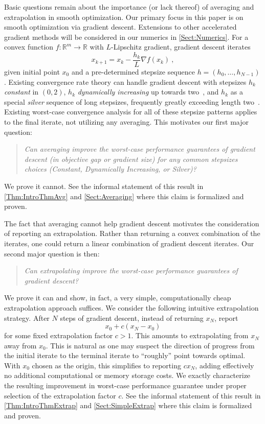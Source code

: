 \documentclass[11pt]{article}
\numberwithin{equation}{section}
\newcommand{\R}{\mathbb{R}}
\theoremstyle{definition}
\theoremstyle{definition}
\theoremstyle{definition}
\newcommand{\1}{\mathbf{1}}
\newcommand{\dimension}{m}
\begin{document}
Basic questions remain about the importance (or lack thereof) of averaging and extrapolation in smooth optimization. Our primary focus in this paper is on smooth optimization via gradient descent. Extensions to other accelerated gradient methods will be considered in our numerics in \cref{Sect:Numerics}. For a convex function $f :\R^\dimension \to \R$ with $L$-Lipschitz gradient, gradient descent iterates
\begin{equation}\label{Eqn:GDStep}
    x_{k+1} = x_k - \frac{h_k}{L}\nabla f(x_k) \ ,
\end{equation}
given initial point $x_0$ and a pre-determined stepsize sequence $h = (h_0, \dots, h_{N-1})$. Existing convergence rate theory can handle gradient descent with stepsizes $h_k$ {\it constant} in $(0,2)$, $h_k$ {\it dynamically increasing} up towards two~\cite{Teboulle_4T_Analytical}, and $h_k$ as a special {\it silver} sequence of long stepsizes, frequently greatly exceeding length two~\cite{Silver_Accel}. Existing worst-case convergence analysis for all of these stepsize patterns applies to the final iterate, not utilizing any averaging. This motivates our first major question:
\begin{quote}
    \emph{Can averaging improve the worst-case performance guarantees of gradient descent (in objective gap or gradient size) for any common stepsizes choices (Constant, Dynamically Increasing, or Silver)?}
\end{quote}
We prove it cannot. See the informal statement of this result in \cref{Thm:IntroThmAvg} and \cref{Sect:Averaging} where this claim is formalized and proven.

The fact that averaging cannot help gradient descent motivates the consideration of reporting an extrapolation. Rather than returning a convex combination of the iterates, one could return a linear combination of gradient descent iterates. Our second major question is then:
\begin{quote}
    \emph{Can extrapolating improve the worst-case performance guarantees of gradient descent?}
\end{quote}
We prove it can and show, in fact, a very simple, computationally cheap extrapolation approach suffices. We consider the following intuitive extrapolation strategy. After $N$ steps of gradient descent, instead of returning $x_N$, report
\begin{equation*}
    x_0 + c(x_N-x_0)
\end{equation*}
for some fixed extrapolation factor $c>1$.
This amounts to extrapolating from $x_N$ away from $x_0$. This is natural as one may suspect the direction of progress from the initial iterate to the terminal iterate to ``roughly'' point towards optimal. With $x_0$ chosen as the origin, this simplifies to reporting $cx_N$, adding effectively no additional computational or memory storage costs. We exactly characterize the resulting improvement in worst-case performance guarantee under proper selection of the extrapolation factor $c$.
See the informal statement of this result in \cref{Thm:IntroThmExtrap} and \cref{Sect:SimpleExtrap} where this claim is formalized and proven.
\end{document}
